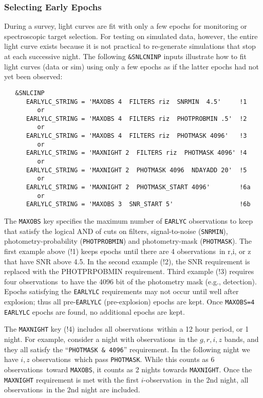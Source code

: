 \documentclass[12pt]{article}
\newcommand{\obs}{observation}
\newcommand{\obss}{observations}
\begin{document}
  \subsubsection{Selecting Early Epochs}
  \label{sss:early}

During a survey, light curves are fit with only a few epochs 
for monitoring or spectroscopic target selection.
For testing on simulated data, however, the entire light curve 
exists because it is not  practical to re-generate simulations
that stop at each successive night.
The following {\tt \&SNLCNINP} inputs illustrate how to 
fit light curves (data or sim) using only a few epochs
as if the latter epochs had not yet been observed:
%
\begin{verbatim}
   &SNLCINP
      EARLYLC_STRING = 'MAXOBS 4  FILTERS riz  SNRMIN  4.5'     !1
         or
      EARLYLC_STRING = 'MAXOBS 4  FILTERS riz  PHOTPROBMIN .5'  !2 
         or
      EARLYLC_STRING = 'MAXOBS 4  FILTERS riz  PHOTMASK 4096'   !3
         or 
      EARLYLC_STRING = 'MAXNIGHT 2  FILTERS riz  PHOTMASK 4096' !4
         or
      EARLYLC_STRING = 'MAXNIGHT 2  PHOTMASK 4096  NDAYADD 20'  !5
         or
      EARLYLC_STRING = 'MAXNIGHT 2  PHOTMASK_START 4096'        !6a
         or
      EARLYLC_STRING = 'MAXOBS 3  SNR_START 5'                  !6b
\end{verbatim}
%
The {\tt MAXOBS} key specifies the maximum number of 
{\tt EARLYC} observations to keep that satisfy the logical 
AND of cuts on 
filters, 
signal-to-noise ({\tt SNRMIN}),
photometry-probability ({\tt PHOTPROBMIN}) and 
photometry-mask ({\tt PHOTMASK}).
The first example above (!1) keeps epochs until there are 4 \obss\
in r,i, or z that have SNR above 4.5. 
In the second example (!2), the SNR requirement is replaced with the 
PHOTPRPOBMIN requirement. Third example (!3) requires four \obss\
to have the 4096 bit of the photometry mask (e.g., detection).
Epochs satisfying the {\tt EARLYLC} requirements may not 
occur until well after explosion; thus all pre-{\tt EARLYLC} (pre-explosion) 
epochs are kept. Once {\tt MAXOBS=4} {\tt EARLYLC} epochs are 
found, no additional epochs are kept. 

The {\tt MAXNIGHT} key (!4) includes all \obss\ within a 
12 hour period, or 1 night. For example, consider a night with \obss\ 
in the $g,r,i,z$ bands, and they all satisfy the ``{\tt PHOTMASK \& 4096}''
requirement. In the following night we have $i,z$ \obss\
which pass {\tt PHOTMASK}.
While this counts as 6 \obss\ toward {\tt MAXOBS}, it counts
as 2 nights towards {\tt MAXNIGHT}. Once the {\tt MAXNIGHT}
requirement is met with the first $i$-\obs\ in the 2nd night, 
all \obss\ in the 2nd night are included.
\end{document}
